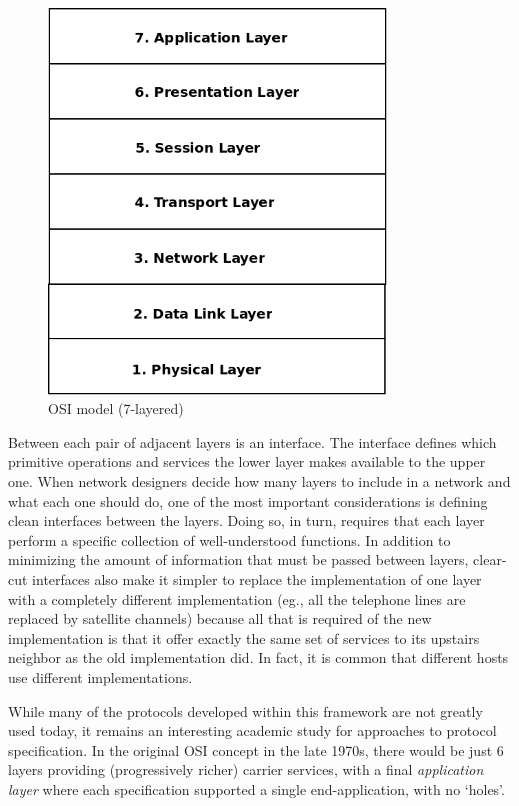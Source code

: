 \documentclass[times, utf8, diplomski]{fer}
\begin{document}
\begin{figure}[htb]
\begin{center}
\leavevmode
\includegraphics[width=0.8\textwidth]{osi_model}
\end{center}
\caption{OSI model (7-layered)}
\label{fig:osi_model}
\end{figure}

Between each pair of adjacent layers is an interface. The interface defines which 
primitive operations and services the lower layer makes available to the upper one. 
When network designers decide how many layers to include in a network and what 
each one should do, one of the most important considerations is defining clean 
interfaces between the layers. Doing so, in turn, requires that each layer perform 
a specific collection of well-understood functions. In addition to minimizing the 
amount of information that must be passed between layers, clear-cut interfaces 
also make it simpler to replace the implementation of one layer with a completely 
different implementation (eg., all the telephone lines are replaced by satellite 
channels) because all that is required of the new implementation is that it 
offer exactly the same set of services to its upstairs neighbor as the old 
implementation did. In fact, it is common that different hosts use different 
implementations.

While many of the protocols developed within this framework are not greatly used 
today, it remains an interesting academic study for approaches to protocol 
specification. In the original OSI concept in the late 1970s, there would be 
just 6 layers providing (progressively richer) carrier services, with a final 
\emph{application layer} where each specification supported a single end-application, 
with no `holes'.
 
\end{document}

